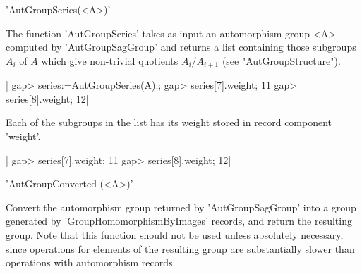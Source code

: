 

'AutGroupSeries(<A>)' 

The  function  'AutGroupSeries'  takes  as  input  an  automorphism  group <A>
computed  by 'AutGroupSagGroup' and returns  a list containing those subgroups
$A_i$   of  $A$  which  give  non-trivial   quotients  $A_i  /  A_{i+1}$  (see
"AutGroupStructure").

|    gap> series:=AutGroupSeries(A);;
    gap> series[7].weight;
    11
    gap> series[8].weight;
    12|


\bigskip

Each of the subgroups in the list has its weight stored in record component
'weight'.

|    gap> series[7].weight;
    11
    gap> series[8].weight;
    12|



'AutGroupConverted (<A>)'

Convert the automorphism group returned by 'AutGroupSagGroup' into a group
generated by 'GroupHomomorphismByImages' records, and return the resulting
group.  Note that this function should not be used unless absolutely
necessary, since operations for elements of the resulting group are
substantially slower than operations with automorphism records.


